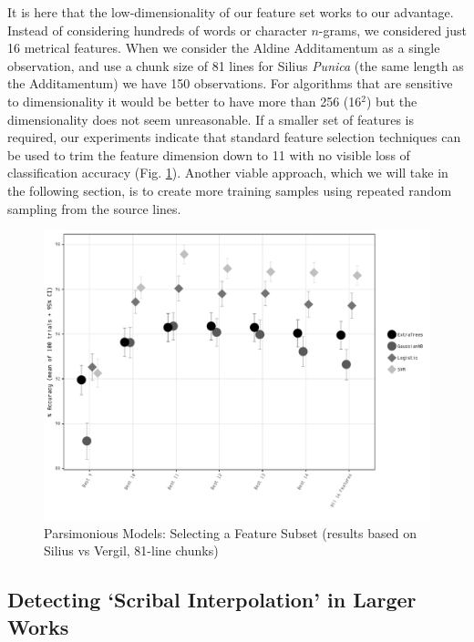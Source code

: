 \documentclass[11pt,a4paper]{scrartcl} %
\begin{document}
It is here that the low-dimensionality of our feature set works to our advantage. Instead of considering hundreds of words or character $n$-grams, we considered just 16 metrical features. When we consider the Aldine Additamentum as a single observation, and use a chunk size of 81 lines for Silius \textit{Punica} (the same length as the Additamentum) we have 150 observations. For algorithms that are sensitive to dimensionality it would be better to have more than 256 (16$^{2}$) but the dimensionality does not seem unreasonable. If a smaller set of features is required, our experiments indicate that standard feature selection techniques can be used to trim the feature dimension down to 11 with no visible loss of classification accuracy (Fig. \ref{fig:glob_feat_sel}). Another viable approach, which we will take in the following section, is to create more training samples using repeated random sampling from the source lines.

\begin{figure}
    \caption{Parsimonious Models: Selecting a Feature Subset (results based on Silius vs Vergil, 81-line chunks)}
    \label{fig:glob_feat_sel}
    \includegraphics[width=\textwidth]{glob_feat_sel_bw.pdf}
\end{figure}

\subsection{Detecting `Scribal Interpolation' in Larger Works}
\end{document}
